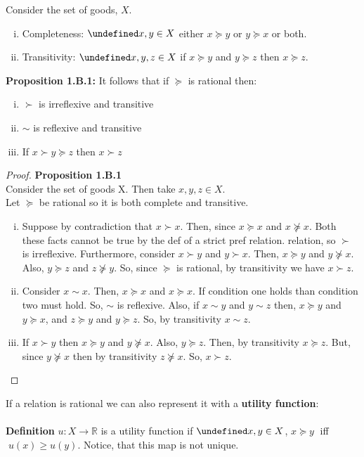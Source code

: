 \documentclass[12pt]{article}
\newcommand{\R}{\mathbb{R}}
\let\oldforall\forall
\let\forall\undefined
\DeclareMathOperator{\forall}{\,\oldforall\,}
\begin{document}
Consider the set of goods, $X$.
\begin{enumerate}[i.]
	\item Completeness: $\forall x,y \in X$ either $x \succeq y$ or $y \succeq x$ or both.
	\item Transitivity: $\forall x,y,z \in X$ if $x \succeq y$ and $y \succeq z$ then $x \succeq z$.
\end{enumerate}

\textbf{Proposition 1.B.1:} It follows that if $\succeq$ is rational then:
\begin{enumerate}[i.]
\item $\succ$ is irreflexive and transitive
\item $\sim$ is reflexive and transitive
\item If $x \succ y \succeq z$ then $x \succ z$
\end{enumerate}


\begin{proof} \textbf{Proposition 1.B.1}
\\Consider the set of goods X. Then take $x,y,z \in X$. 
\\Let $\succeq$ be rational so it is both complete and transitive.
\begin{enumerate}[i.]
\item Suppose by contradiction that $x \succ x$. Then, since $x \succeq x$ and $x \not\succeq x$. Both these facts cannot be true by the def of a strict pref relation. relation, so $\succ$ is irreflexive. Furthermore, consider $x \succ y$ and $y \succ x$. Then, $ x \succeq y$ and $y \not\succeq x$. Also, $ y \succeq z$ and $z \not\succeq y$. So, since $\succeq$ is rational, by transitivity we have $x \succ z$.
\item Consider $x \sim x$. Then,  $x \succeq x$ and $x \succeq x$. If condition one holds than condition two must hold. So, $\sim$ is reflexive. Also, if $x \sim y$ and $y \sim z$ then, $x \succeq y$ and $y \succeq x$, and $z \succeq y$ and $y \succeq z$. So, by transitivity $x \sim z$.
\item If $x \succ y $ then $x \succeq y$ and $y \not\succeq x$. Also, $y \succeq z$. Then, by transitivity $x \succeq z$. But, since $y \not\succeq x$ then by transitivity $z \not\succeq x$. So, $x \succ z$.
\end{enumerate}
\end{proof}
\noindent
If a relation is rational we can also represent it with a \textbf{utility function}:
\\\textbf{\\Definition} $u: X \rightarrow \R$ is a utility function if $\forall x,y \in X$, $x\succeq y \; $ iff $ \; u(x) \geq u(y)$.
Notice, that this map is not unique.
\end{document}
